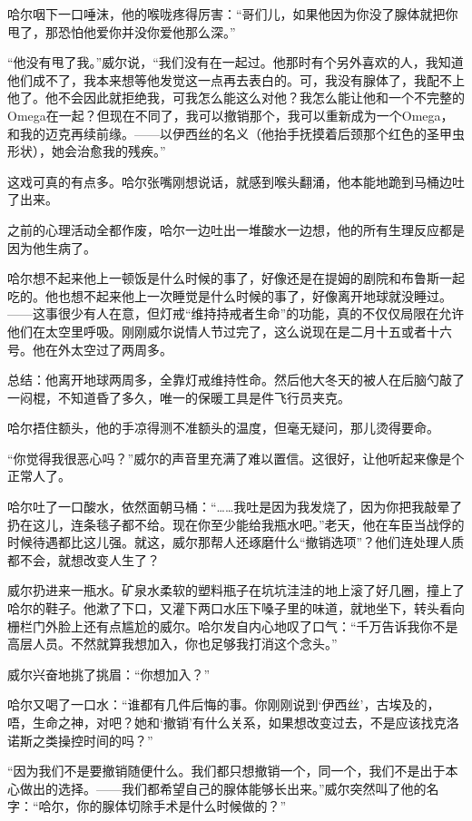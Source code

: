 \documentclass[../main]{subfiles}
\begin{document}
哈尔咽下一口唾沫，他的喉咙疼得厉害：“哥们儿，如果他因为你没了腺体就把你甩了，那恐怕他爱你并没你爱他那么深。”

“他没有甩了我。”威尔说，“我们没有在一起过。他那时有个另外喜欢的人，我知道他们成不了，我本来想等他发觉这一点再去表白的。可，我没有腺体了，我配不上他了。他不会因此就拒绝我，可我怎么能这么对他？我怎么能让他和一个不完整的Omega在一起？但现在不同了，我可以撤销那个，我可以重新成为一个Omega，和我的迈克再续前缘。——以伊西丝的名义（他抬手抚摸着后颈那个红色的圣甲虫形状），她会治愈我的残疾。”

这戏可真的有点多。哈尔张嘴刚想说话，就感到喉头翻涌，他本能地跪到马桶边吐了出来。

之前的心理活动全都作废，哈尔一边吐出一堆酸水一边想，他的所有生理反应都是因为他生病了。

哈尔想不起来他上一顿饭是什么时候的事了，好像还是在提姆的剧院和布鲁斯一起吃的。他也想不起来他上一次睡觉是什么时候的事了，好像离开地球就没睡过。——这事很少有人在意，但灯戒“维持持戒者生命”的功能，真的不仅仅局限在允许他们在太空里呼吸。刚刚威尔说情人节过完了，这么说现在是二月十五或者十六号。他在外太空过了两周多。

总结：他离开地球两周多，全靠灯戒维持性命。然后他大冬天的被人在后脑勺敲了一闷棍，不知道昏了多久，唯一的保暖工具是件飞行员夹克。

哈尔捂住额头，他的手凉得测不准额头的温度，但毫无疑问，那儿烫得要命。

“你觉得我很恶心吗？”威尔的声音里充满了难以置信。这很好，让他听起来像是个正常人了。

哈尔吐了一口酸水，依然面朝马桶：“……我吐是因为我发烧了，因为你把我敲晕了扔在这儿，连条毯子都不给。现在你至少能给我瓶水吧。”老天，他在车臣当战俘的时候待遇都比这儿强。就这，威尔那帮人还琢磨什么“撤销选项”？他们连处理人质都不会，就想改变人生了？

威尔扔进来一瓶水。矿泉水柔软的塑料瓶子在坑坑洼洼的地上滚了好几圈，撞上了哈尔的鞋子。他漱了下口，又灌下两口水压下嗓子里的味道，就地坐下，转头看向栅栏门外脸上还有点尴尬的威尔。哈尔发自内心地叹了口气：“千万告诉我你不是高层人员。不然就算我想加入，你也足够我打消这个念头。”

威尔兴奋地挑了挑眉：“你想加入？”

哈尔又喝了一口水：“谁都有几件后悔的事。你刚刚说到‘伊西丝’，古埃及的，唔，生命之神，对吧？她和‘撤销’有什么关系，如果想改变过去，不是应该找克洛诺斯之类操控时间的吗？”

“因为我们不是要撤销随便什么。我们都只想撤销一个，同一个，我们不是出于本心做出的选择。——我们都希望自己的腺体能够长出来。”威尔突然叫了他的名字：“哈尔，你的腺体切除手术是什么时候做的？”
\end{document}
